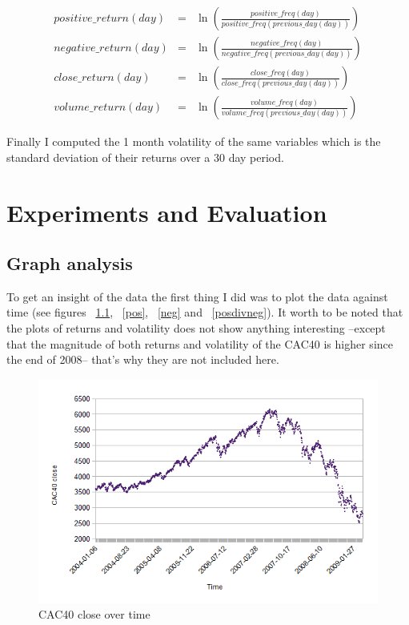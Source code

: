 \documentclass[12pt]{report}
\begin{document}
			\begin{eqnarray}
				positive\_return(day) &=& \ln\left(\frac{positive\_freq(day)}{positive\_freq(previous\_day(day))}\right)\label{preturn}\\
				negative\_return(day) &=& \ln\left(\frac{negative\_freq(day)}{negative\_freq(previous\_day(day))}\right)\label{nreturn}\\
				close\_return(day) &=& \ln\left(\frac{close\_freq(day)}{close\_freq(previous\_day(day))}\right)\label{creturn}\\
				volume\_return(day) &=& \ln\left(\frac{volume\_freq(day)}{volume\_freq(previous\_day(day))}\right)\label{vreturn}
			\end{eqnarray}
			
			Finally I computed the 1 month volatility of the same variables which is the standard deviation of their returns over a 30 day period.
			
	\chapter{Experiments and Evaluation}
		\section{Graph analysis}
		
			To get an insight of the data the first thing I did was to plot the data against time (see figures ~\ref{cac}, ~\ref{pos}, ~\ref{neg} and ~\ref{posdivneg}). It worth to be noted that the plots of returns and volatility does not show anything interesting --except that the magnitude of both returns and volatility of the CAC40 is higher since the end of 2008-- that's why they are not included here.

			\begin{figure}[h!]
				\caption{CAC40 close over time\label{cac}}
				\includegraphics{plots/time/cac.png}
			\end{figure}
\end{document}
